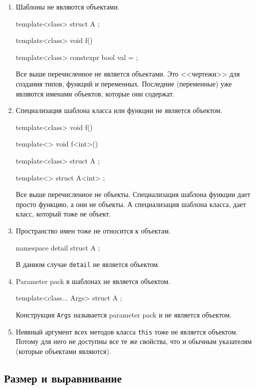 \documentclass{article}
\begin{document}
\begin{enumerate}
\item Шаблоны не являются объектами.
\begin{cppcode}[numbers = none]
template<class>
struct A {};

template<class>
void f() {}

template<class>
constexpr bool val = {};
\end{cppcode}
Все выше перечисленное не является объектами.
Это <<чертежи>> для создания типов, функций и переменных.
Последние (переменные) уже являются именами объектов, которые они содержат.

\item Специализация шаблона класса или функции не является объектом.
\begin{cppcode}[numbers = none]
template<class>
void f() {}

template<>
void f<int>() {}

template<class>
struct A {};

template<>
struct A<int> {};
\end{cppcode}
Все выше перечисленное не объекты.
Специализация шаблона функции дает просто функцию, а они не объекты.
А специализация шаблона класса, дает класс, который тоже не объект.

\item Пространство имен тоже не относится к объектам.
\begin{cppcode}[numbers = none]
namespace detail {
  struct A {};
}
\end{cppcode}
В данном случае \verb"detail" не является объектом.

\item Parameter pack в шаблонах не является объектом.
\begin{cppcode}[numbers = none]
template<class... Args>
struct A {};
\end{cppcode}
Конструкция \verb"Args" называется parameter pack и не является объектом.

\item Неявный аргумент всех методов класса \verb"this" тоже не является объектом.
Потому для него не доступны все те же свойства, что и обычным указателям (которые объектами являются).
\end{enumerate}

\subsection{Размер и выравнивание}
\label{section::ObjSizeAlignment}
\end{document}
